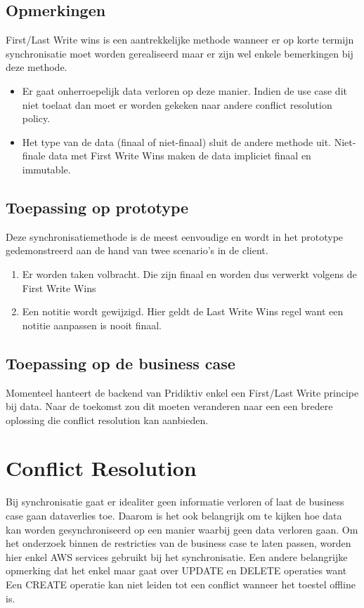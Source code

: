 \subsection{Opmerkingen}
First/Last Write wins is een aantrekkelijke methode wanneer er op korte termijn synchronisatie moet worden gerealiseerd maar er zijn wel enkele bemerkingen bij deze methode.
\begin{itemize}
\item Er gaat onherroepelijk data verloren op deze manier. Indien de use case dit niet toelaat dan moet er worden gekeken naar andere conflict resolution policy.
\item Het type van de data (finaal of niet-finaal) sluit de andere methode uit. Niet-finale data met First Write Wins maken de data impliciet finaal en immutable.
\end{itemize}
\subsection{Toepassing op prototype}
Deze synchronisatiemethode is de meest eenvoudige en wordt in het prototype gedemonstreerd aan de hand van twee scenario's in de client.
\begin{enumerate}
\item Er worden taken volbracht. Die zijn finaal en worden dus verwerkt volgens de First Write Wins
\item Een notitie wordt gewijzigd. Hier geldt de Last Write Wins regel want een notitie aanpassen is nooit finaal.
\end{enumerate}
\subsection{Toepassing op de business case}
Momenteel hanteert de backend van Pridiktiv enkel een First/Last Write principe bij data. Naar de toekomst zou dit moeten veranderen naar een een bredere oplossing die conflict resolution kan aanbieden.
\section{Conflict Resolution}
Bij synchronisatie gaat er idealiter geen informatie verloren of laat de business case gaan dataverlies toe. Daarom is het ook belangrijk om te kijken hoe data kan worden gesynchroniseerd op een manier waarbij geen data verloren gaan. Om het onderzoek binnen de restricties van de business case te laten passen, worden hier enkel AWS services gebruikt bij het synchronisatie. Een andere belangrijke opmerking dat het enkel maar gaat over UPDATE en DELETE operaties want Een CREATE operatie kan niet leiden tot een conflict wanneer het toestel offline is.
